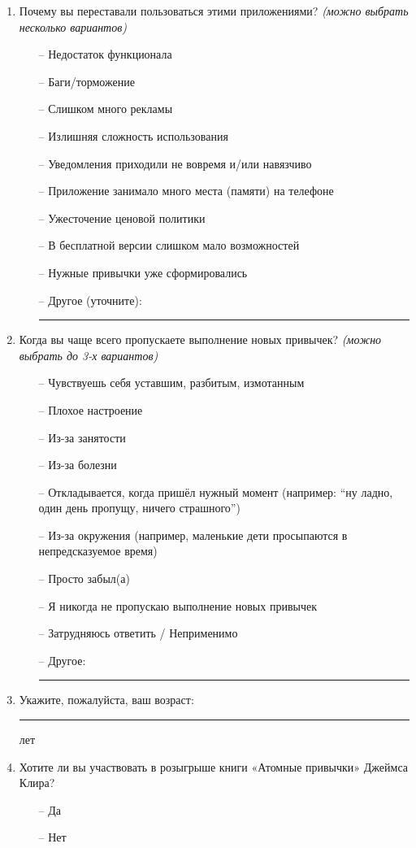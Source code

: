 \documentclass[pdflatex,sn-mathphys-num]{sn-jnl}%
\theoremstyle{thmstyleone}%
\theoremstyle{thmstyletwo}%
\theoremstyle{thmstylethree}%
\begin{document}
\begin{appendices}
\begin{enumerate}
  \item Почему вы переставали пользоваться этими приложениями? \textit{(можно выбрать несколько вариантов)}
  \begin{itemize}
    \item[–] Недостаток функционала
    \item[–] Баги/торможение
    \item[–] Слишком много рекламы
    \item[–] Излишняя сложность использования
    \item[–] Уведомления приходили не вовремя и/или навязчиво
    \item[–] Приложение занимало много места (памяти) на телефоне
    \item[–] Ужесточение ценовой политики
    \item[–] В бесплатной версии слишком мало возможностей
    \item[–] Нужные привычки уже сформировались
    \item[–] Другое (уточните): \rule{0.6\linewidth}{0.4pt}
  \end{itemize}

  \item Когда вы чаще всего пропускаете выполнение новых привычек? \textit{(можно выбрать до 3-х вариантов)}
  \begin{itemize}
    \item[–] Чувствуешь себя уставшим, разбитым, измотанным
    \item[–] Плохое настроение
    \item[–] Из-за занятости
    \item[–] Из-за болезни
    \item[–] Откладывается, когда пришёл нужный момент (например: “ну ладно, один день пропущу, ничего страшного”)
    \item[–] Из-за окружения (например, маленькие дети просыпаются в непредсказуемое время)
    \item[–] Просто забыл(а)
    \item[–] Я никогда не пропускаю выполнение новых привычек
    \item[–] Затрудняюсь ответить / Неприменимо
    \item[–] Другое: \rule{0.6\linewidth}{0.4pt}
  \end{itemize}

  \item Укажите, пожалуйста, ваш возраст: \rule{2cm}{0.4pt} лет

  \item Хотите ли вы участвовать в розыгрыше книги «Атомные привычки» Джеймса Клира?
  \begin{itemize}
    \item[–] Да
    \item[–] Нет
  \end{itemize}


\end{enumerate}
\end{appendices}
\end{document}
